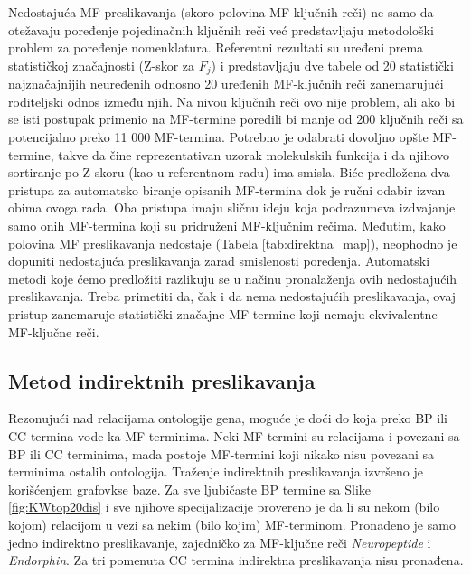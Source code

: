 Nedostajuća MF preslikavanja (skoro polovina MF-ključnih reči) ne samo da otežavaju
poređenje pojedinačnih ključnih reči već predstavljaju metodološki problem za
poređenje nomenklatura.  Referentni rezultati su uređeni prema statističkoj
značajnosti (Z-skor za $F_j$) i predstavljaju dve tabele od 20 statistički
najznačajnijih neuređenih odnosno 20 uređenih MF-ključnih reči zanemarujući
roditeljski odnos između njih. Na nivou ključnih reči ovo nije problem, ali ako
bi se isti postupak primenio na MF-termine poredili bi manje od 200 ključnih
reči sa potencijalno preko 11 000 MF-termina. Potrebno je odabrati dovoljno
opšte MF-termine, takve da čine reprezentativan uzorak molekulskih funkcija i
da njihovo sortiranje po Z-skoru (kao u referentnom radu) ima smisla.  Biće
predložena dva pristupa za automatsko biranje opisanih MF-termina dok je ručni
odabir izvan obima ovoga rada.  Oba pristupa imaju sličnu ideju koja podrazumeva izdvajanje samo 
onih MF-termina koji su pridruženi MF-ključnim rečima. Međutim, kako polovina MF preslikavanja nedostaje (Tabela \ref{tab:direktna_map}), neophodno je dopuniti
nedostajuća preslikavanja zarad smislenosti poređenja.  Automatski metodi koje ćemo
predložiti razlikuju se u načinu pronalaženja ovih nedostajućih preslikavanja.
Treba primetiti da, čak i da nema nedostajućih preslikavanja, ovaj pristup
zanemaruje statistički značajne MF-termine koji nemaju ekvivalentne MF-ključne
reči. 



\clearpage

\subsection{Metod indirektnih preslikavanja}

Rezonujući nad relacijama ontologije gena, moguće je doći do
 koja preko BP ili CC termina vode ka MF-terminima. Neki MF-termini su relacijama  i
 povezani sa BP ili CC terminima, mada postoje MF-termini
koji nikako nisu povezani sa terminima ostalih  ontologija. Traženje
indirektnih preslikavanja izvršeno je korišćenjem  grafovkse baze.
Za sve ljubičaste BP termine sa Slike \ref{fig:KWtop20dis} i sve njihove
specijalizacije provereno je da li su nekom (bilo kojom) relacijom u vezi sa
nekim (bilo kojim) MF-terminom. Pronađeno je samo jedno indirektno preslikavanje,
zajedničko za MF-ključne reči \textit{Neuropeptide} i \textit{Endorphin}. Za
tri pomenuta CC termina indirektna preslikavanja nisu pronađena. 



